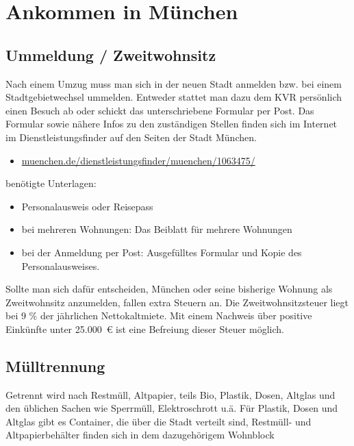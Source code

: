 ﻿
\section{Ankommen in München}

\subsection{Ummeldung / Zweitwohnsitz}

Nach einem Umzug muss man sich in der neuen Stadt anmelden bzw. bei einem Stadtgebietwechsel ummelden. Entweder stattet man dazu dem KVR persönlich einen Besuch ab oder schickt das unterschriebene Formular per Post. Das Formular sowie nähere Infos zu den zuständigen Stellen finden sich im Internet im Dienstleistungsfinder auf den Seiten der Stadt München.

\begin{itemize}
	\item \url{muenchen.de/dienstleistungsfinder/muenchen/1063475/}
\end{itemize}

benötigte Unterlagen: %
\begin{itemize}
	\item Personalausweis oder Reisepass
	\item bei mehreren Wohnungen: Das Beiblatt für mehrere Wohnungen
	\item bei der Anmeldung per Post: Ausgefülltes Formular und Kopie des Personalausweises.
\end{itemize}

Sollte man sich dafür entscheiden, München oder seine bisherige Wohnung als Zweitwohnsitz anzumelden, fallen extra Steuern an. Die Zweitwohnsitzsteuer liegt bei 9 \% der jährlichen Nettokaltmiete. Mit einem Nachweis über positive Einkünfte unter 25.000~€ ist eine Befreiung dieser Steuer möglich.

\subsection{Mülltrennung}
Getrennt wird nach Restmüll, Altpapier, teils Bio, Plastik, Dosen, Altglas und den üblichen Sachen wie Sperrmüll, Elektroschrott u.ä.
Für Plastik, Dosen und Altglas gibt es Container, die über die Stadt verteilt sind, Restmüll- und Altpapierbehälter finden sich in dem dazugehörigem Wohnblock

